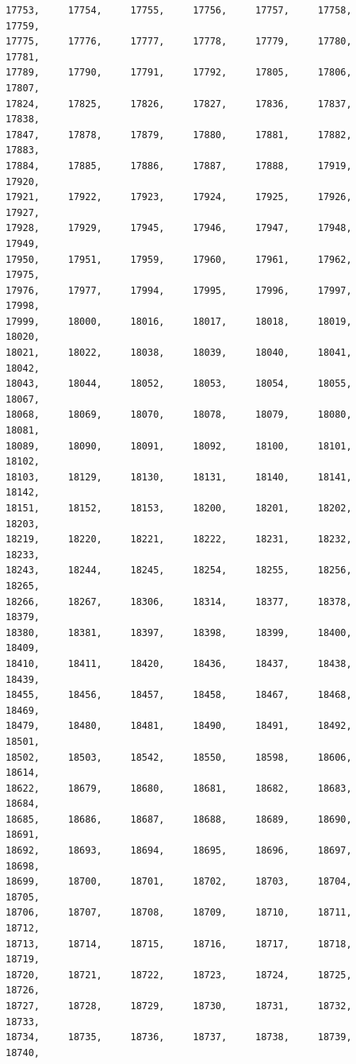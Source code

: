 \documentclass[a4paper,11pt]{report}
\begin{document}
\begin{verbatim}
17753,     17754,     17755,     17756,     17757,     17758,     17759,     
17775,     17776,     17777,     17778,     17779,     17780,     17781,     
17789,     17790,     17791,     17792,     17805,     17806,     17807,     
17824,     17825,     17826,     17827,     17836,     17837,     17838,     
17847,     17878,     17879,     17880,     17881,     17882,     17883,     
17884,     17885,     17886,     17887,     17888,     17919,     17920,     
17921,     17922,     17923,     17924,     17925,     17926,     17927,     
17928,     17929,     17945,     17946,     17947,     17948,     17949,     
17950,     17951,     17959,     17960,     17961,     17962,     17975,     
17976,     17977,     17994,     17995,     17996,     17997,     17998,     
17999,     18000,     18016,     18017,     18018,     18019,     18020,     
18021,     18022,     18038,     18039,     18040,     18041,     18042,     
18043,     18044,     18052,     18053,     18054,     18055,     18067,     
18068,     18069,     18070,     18078,     18079,     18080,     18081,     
18089,     18090,     18091,     18092,     18100,     18101,     18102,     
18103,     18129,     18130,     18131,     18140,     18141,     18142,     
18151,     18152,     18153,     18200,     18201,     18202,     18203,     
18219,     18220,     18221,     18222,     18231,     18232,     18233,     
18243,     18244,     18245,     18254,     18255,     18256,     18265,     
18266,     18267,     18306,     18314,     18377,     18378,     18379,     
18380,     18381,     18397,     18398,     18399,     18400,     18409,     
18410,     18411,     18420,     18436,     18437,     18438,     18439,     
18455,     18456,     18457,     18458,     18467,     18468,     18469,     
18479,     18480,     18481,     18490,     18491,     18492,     18501,     
18502,     18503,     18542,     18550,     18598,     18606,     18614,     
18622,     18679,     18680,     18681,     18682,     18683,     18684,     
18685,     18686,     18687,     18688,     18689,     18690,     18691,     
18692,     18693,     18694,     18695,     18696,     18697,     18698,     
18699,     18700,     18701,     18702,     18703,     18704,     18705,     
18706,     18707,     18708,     18709,     18710,     18711,     18712,     
18713,     18714,     18715,     18716,     18717,     18718,     18719,     
18720,     18721,     18722,     18723,     18724,     18725,     18726,     
18727,     18728,     18729,     18730,     18731,     18732,     18733,     
18734,     18735,     18736,     18737,     18738,     18739,     18740,     

\end{verbatim}
\end{document}
